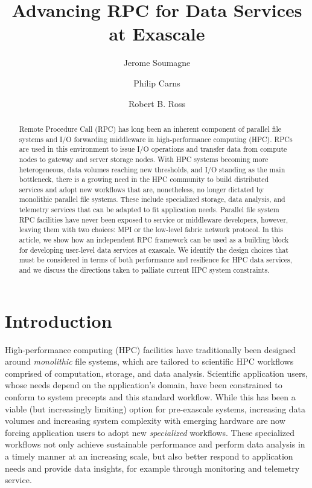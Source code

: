 \documentclass[11pt]{article}
\begin{document}
\title{Advancing RPC for Data Services at Exascale}
\author[1]{Jerome Soumagne}
\author[2]{Philip Carns}
\author[2]{Robert B. Ross}

\maketitle

\begin{abstract}
Remote Procedure Call (RPC) has long been an inherent component of parallel
file systems and I/O forwarding middleware in high-performance computing
(HPC).  RPCs are used in this environment to issue
I/O operations and transfer data from compute nodes to gateway and server storage
nodes. With HPC systems becoming more heterogeneous, data volumes
reaching new thresholds, and I/O standing as the main bottleneck, there is a growing
need in the HPC community to build distributed services and adopt new workflows
that are, nonetheless, no longer dictated by monolithic parallel file systems. These include
specialized storage, data analysis, and telemetry
services that can be adapted to fit application needs. Parallel file system
RPC facilities have never been exposed to service or middleware developers,
however, leaving them with two choices: MPI or the low-level fabric network
protocol.
In this article, we show how an independent RPC framework can be used as a building block for
developing user-level data services at exascale. We identify the design
choices that must be considered in terms of both performance and resilience
for HPC
data services, and we discuss the directions taken to palliate current HPC system constraints.
\end{abstract}

\section{Introduction}
\label{sec:intro}

High-performance computing (HPC) facilities have traditionally
been designed around \textit{monolithic} file systems, which are tailored to
scientific HPC workflows comprised of computation, storage, and
data analysis. Scientific application users, whose needs depend
on the application's domain, have been constrained to conform to system precepts
and this standard workflow. While this has been
a viable (but increasingly limiting) option for pre-exascale systems,
increasing data volumes and increasing system complexity with
emerging hardware are now forcing application users to adopt new
\textit{specialized} workflows.  These specialized workflows not only achieve sustainable
performance and perform data analysis in a timely manner at an increasing
scale, but also better respond to application needs and provide data
insights, for example through monitoring and telemetry service.
\end{document}

